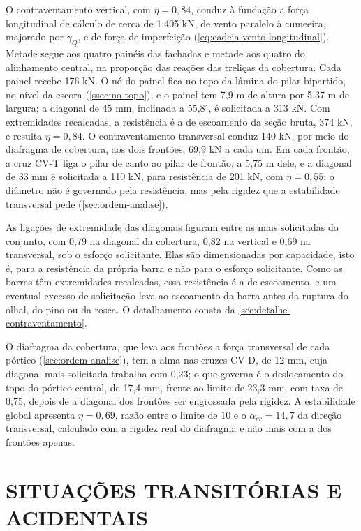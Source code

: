 O contraventamento vertical, com $\eta = 0{,}84$, conduz à fundação a força
longitudinal de cálculo de cerca de 1.405 kN, de vento paralelo à cumeeira,
majorado por $\gamma_Q$, e de força de imperfeição
(\autoref{eq:cadeia-vento-longitudinal}). Metade segue aos quatro painéis das fachadas e metade aos quatro do
alinhamento central, na proporção das reações das treliças da cobertura. Cada
painel recebe 176 kN. O nó do painel fica no topo da lâmina do pilar bipartido,
no nível da escora (\autoref{ssec:no-topo}), e o painel tem 7,9 m de altura por
5,37 m de largura; a diagonal de 45 mm, inclinada a 55,8$^{\circ}$, é solicitada a
313 kN. Com extremidades recalcadas, a resistência é a de escoamento da seção
bruta, 374 kN, e resulta $\eta = 0{,}84$. O
contraventamento transversal conduz 140 kN, por meio do diafragma de
cobertura, aos dois frontões, 69,9 kN a cada um. Em cada frontão, a cruz CV-T
liga o pilar de canto ao pilar de frontão, a 5,75 m dele, e a diagonal de 33 mm
é solicitada a 110 kN, para resistência de 201 kN, com $\eta = 0{,}55$: o diâmetro
não é governado pela resistência, mas pela rigidez que a estabilidade transversal
pede (\autoref{sec:ordem-analise}).

As ligações de extremidade das diagonais figuram entre as mais solicitadas do
conjunto, com 0,79 na diagonal da cobertura, 0,82 na vertical e 0,69 na
transversal, sob o esforço solicitante. Elas são
dimensionadas por capacidade, isto é, para a resistência da própria barra e não
para o esforço solicitante. Como as barras têm extremidades recalcadas, essa
resistência é a de escoamento, e um eventual excesso de solicitação leva ao
escoamento da barra antes da ruptura do olhal, do pino ou da rosca. O detalhamento consta da \autoref{sec:detalhe-contraventamento}.

O diafragma da cobertura, que leva aos frontões a força transversal de cada
pórtico (\autoref{sec:ordem-analise}), tem a alma nas cruzes CV-D, de 12 mm, cuja
diagonal mais solicitada trabalha com 0,23; o que governa é o deslocamento do topo
do pórtico central, de 17,4 mm, frente ao limite de 23,3 mm, com taxa de 0,75,
depois de a diagonal dos frontões ser engrossada pela rigidez. A estabilidade global
apresenta $\eta = 0{,}69$, razão entre o limite de 10 e o $\alpha_{cr} = 14{,}7$ da
direção transversal, calculado com a
rigidez real do diafragma e não mais com a dos frontões apenas.

\section{SITUAÇÕES TRANSITÓRIAS E ACIDENTAIS}\label{sec:verif-transitorias}

